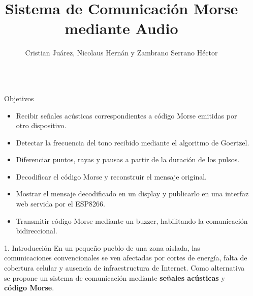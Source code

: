 \documentclass[final]{beamer}
\title{Sistema de Comunicación Morse mediante Audio}
\author{Cristian Juárez, Nicolaus Hernán y Zambrano Serrano Héctor}
\institute{Universidad Nacional de Hurlingham \\ Arquitectura de Computadoras --- Docente: Ing. Caroli Natalia}
\newlength{\sepwid}
\newlength{\onecolwid}
\begin{document}
\setlength{\belowcaptionskip}{2ex}
\setlength\belowdisplayshortskip{2ex}

\begin{frame}[t]
\begin{columns}[t]

\begin{column}{\sepwid}\end{column}

\begin{column}{\onecolwid}

\begin{alertblock}{Objetivos}
\begin{itemize}
\item Recibir señales acústicas correspondientes a código Morse emitidas por otro dispositivo.
\item Detectar la frecuencia del tono recibido mediante el algoritmo de Goertzel.
\item Diferenciar puntos, rayas y pausas a partir de la duración de los pulsos.
\item Decodificar el código Morse y reconstruir el mensaje original.
\item Mostrar el mensaje decodificado en un display y publicarlo en una interfaz web servida por el ESP8266.
\item Transmitir código Morse mediante un buzzer, habilitando la comunicación bidireccional.
\end{itemize}
\end{alertblock}

\begin{block}{1. Introducción}
En un pequeño pueblo de una zona aislada, las comunicaciones convencionales se ven afectadas por cortes de energía, falta de cobertura celular y ausencia de infraestructura de Internet. Como alternativa se propone un sistema de comunicación mediante \textbf{señales acústicas} y \textbf{código Morse}.


\end{block}
\end{column}
\end{columns}
\end{frame}
\end{document}
